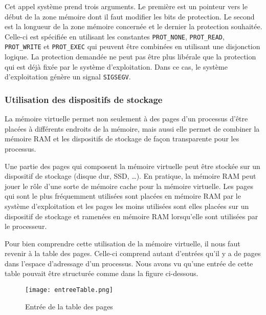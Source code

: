 Cet appel système prend trois arguments. Le première est un pointeur
vers le début de la zone mémoire dont il faut modifier les bits de
protection. Le second est la longueur de la zone mémoire concernée et
le dernier la protection souhaitée. Celle-ci est spécifiée en
utilisant les constantes \verb#PROT_NONE#, \verb#PROT_READ#,
\verb#PROT_WRITE# et \verb#PROT_EXEC# qui peuvent être combinées en utilisant une
disjonction logique. La protection demandée ne peut pas être plus
libérale que la protection qui est déjà fixée par le système
d'exploitation. Dans ce cas, le système d'exploitation génère un
signal \verb#SIGSEGV#.\newline
   
\subsubsection{Utilisation des dispositifs de stockage}
 
La mémoire virtuelle permet non seulement à des pages d'un processus
d'être placées à différents endroits de la mémoire, mais aussi elle
permet de combiner la mémoire RAM et les dispositifs de stockage de
façon transparente pour les processus.\newline
   
Une partie des pages qui composent la mémoire virtuelle peut être
stockée sur un dispositif de stockage (disque dur, SSD, \ldots). En
pratique, la mémoire RAM peut jouer le rôle d'une sorte de mémoire
cache pour la mémoire virtuelle. Les pages qui sont le plus
fréquemment utilisées sont placées en mémoire RAM par le système
d'exploitation et les pages les moins utilisées sont elles placées
sur un dispositif de stockage et ramenées en mémoire RAM lorsqu'elle
sont utilisées par le processeur.\newline
   
Pour bien comprendre cette utilisation de la mémoire virtuelle, il
nous faut revenir à la table des pages. Celle-ci comprend autant
d'entrées qu'il y a de pages dans l'espace d'adressage d'un
processus. Nous avons vu qu'une entrée de cette table pouvait être
structurée comme dans la figure ci-dessous.\newline

\begin{figure}[!ht]
    \centering
    \texttt{[image: entreeTable.png]}
    \caption{Entrée de la table des pages}
\end{figure}

